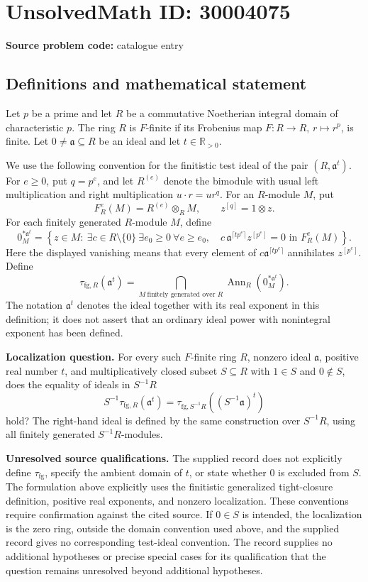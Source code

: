 \documentclass[11pt]{article}
\newcommand{\R}{\mathbb{R}}
\begin{document}
\section*{UnsolvedMath ID: 30004075}
\textbf{Source problem code:} catalogue entry
\subsection{Definitions and mathematical statement}
Let \(p\) be a prime and let \(R\) be a commutative Noetherian integral domain of characteristic \(p\). The ring \(R\) is \(F\)-finite if its Frobenius map \(F:R\to R\), \(r\mapsto r^p\), is finite. Let \(0\ne\mathfrak a\subseteq R\) be an ideal and let \(t\in\R_{>0}\).

We use the following convention for the finitistic test ideal of the pair \((R,\mathfrak a^t)\). For \(e\geq0\), put \(q=p^e\), and let \(R^{(e)}\) denote the bimodule with usual left multiplication and right multiplication \(u\cdot r=ur^q\). For an \(R\)-module \(M\), put
\[
F_R^e(M)=R^{(e)}\otimes_R M,\qquad z^{[q]}=1\otimes z.
\]
For each finitely generated \(R\)-module \(M\), define
\[
0_M^{*\mathfrak a^t}
=
\left\{z\in M:\ \exists c\in R\setminus\{0\}\ \exists e_0\geq0\ \forall e\geq e_0,\quad
c\,\mathfrak a^{\lceil t p^e\rceil}z^{[p^e]}=0
\text{ in }F_R^e(M)\right\}.
\]
Here the displayed vanishing means that every element of \(c\mathfrak a^{\lceil tp^e\rceil}\) annihilates \(z^{[p^e]}\). Define
\[
\tau_{\mathrm{fg},R}(\mathfrak a^t)
=
\bigcap_{M\ \text{finitely generated over }R}
\operatorname{Ann}_R\!\left(0_M^{*\mathfrak a^t}\right).
\]
The notation \(\mathfrak a^t\) denotes the ideal together with its real exponent in this definition; it does not assert that an ordinary ideal power with nonintegral exponent has been defined.

\textbf{Localization question.} For every such \(F\)-finite ring \(R\), nonzero ideal \(\mathfrak a\), positive real number \(t\), and multiplicatively closed subset \(S\subseteq R\) with \(1\in S\) and \(0\notin S\), does the equality of ideals in \(S^{-1}R\)
\[
S^{-1}\tau_{\mathrm{fg},R}(\mathfrak a^t)
=
\tau_{\mathrm{fg},S^{-1}R}\!\left((S^{-1}\mathfrak a)^t\right)
\]
hold? The right-hand ideal is defined by the same construction over \(S^{-1}R\), using all finitely generated \(S^{-1}R\)-modules.

\textbf{Unresolved source qualifications.} The supplied record does not explicitly define \(\tau_{\mathrm{fg}}\), specify the ambient domain of \(t\), or state whether \(0\) is excluded from \(S\). The formulation above explicitly uses the finitistic generalized tight-closure definition, positive real exponents, and nonzero localization. These conventions require confirmation against the cited source. If \(0\in S\) is intended, the localization is the zero ring, outside the domain convention used above, and the supplied record gives no corresponding test-ideal convention. The record supplies no additional hypotheses or precise special cases for its qualification that the question remains unresolved beyond additional hypotheses.
\end{document}
